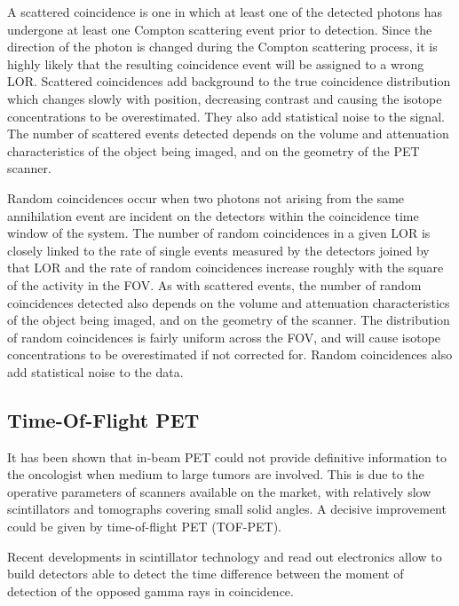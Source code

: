 A scattered coincidence is one in which at least one of the detected photons has undergone at least one Compton scattering event prior to detection. Since the direction of the photon is changed during the Compton scattering process, it is highly likely that the resulting coincidence event will be assigned to a wrong LOR. Scattered coincidences add background to the true coincidence distribution which changes slowly with position, decreasing contrast and causing the isotope concentrations to be overestimated. They also add statistical noise to the signal. The number of scattered events detected depends on the volume and attenuation characteristics of the object being imaged, and on the geometry of the PET scanner.

Random coincidences occur when two photons not arising from the same annihilation event are incident on the detectors within the coincidence time window of the system. The number of random coincidences in a given LOR is closely linked to the rate of single events measured by the detectors joined by that LOR and the rate of random coincidences increase roughly with the square of the activity in the FOV. As with scattered events, the number of random coincidences detected also depends on the volume and attenuation characteristics of the object being imaged, and on the geometry of the scanner. The distribution of random coincidences is fairly uniform across the FOV, and will cause isotope concentrations to be overestimated if not corrected for. Random coincidences also add statistical noise to the data.

\subsection{Time-Of-Flight PET}

It has been shown that in-beam PET could not provide definitive information to the oncologist when medium to large tumors are involved\cite{Fiedler2006}. This is due to the operative parameters of scanners available on the market, with relatively slow scintillators and tomographs covering small solid angles. A decisive improvement could be given by time-of-flight PET (TOF-PET).

Recent developments in scintillator technology and read out electronics allow to build detectors able to detect the time difference between the moment of detection of the opposed gamma rays in coincidence. 

